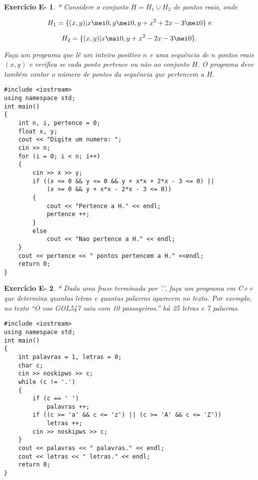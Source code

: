 \documentclass[a4paper]{article}
\newtheorem{eex}{Exerc\'icio E-}
\begin{document}
\newpage 

\begin{eex}
* Considere o conjunto $H = H_1 \cup H_2$ de pontos reais, onde

\[
H_1 = \{ (x,y) | x \mei 0, y \mei 0, y + x^2 + 2x - 3 \mei 0 \} \text{ e}
\]

\[
H_2 = \{ (x,y) | x \mai 0, y + x^2 - 2x - 3 \mei 0 \}.
\]

Faça um programa que lê um inteiro positivo $n$ e uma sequência de $n$ pontos reais $(x,y)$ e verifica se cada ponto pertence ou não ao conjunto $H$. O programa deve também contar o número de pontos da sequência que pertencem a $H$.
\end{eex}

\begin{sol}
\begin{lstlisting}
#include <iostream>
using namespace std;
int main()
{
    int n, i, pertence = 0;
    float x, y;
    cout << "Digite um numero: ";
    cin >> n;
    for (i = 0; i < n; i++)
    {
        cin >> x >> y;
        if ((x <= 0 && y <= 0 && y + x*x + 2*x - 3 <= 0) ||
            (x >= 0 && y + x*x - 2*x - 3 <= 0))
        {
            cout << "Pertence a H." << endl;
            pertence ++;
        }
        else
            cout << "Nao pertence a H." << endl;
    }
    cout << pertence << " pontos pertencem a H." <<endl;
    return 0;
}
\end{lstlisting}
\end{sol}

\newpage 

\begin{eex}
* Dada uma frase terminada por ’.’, faça um programa em C++ que determina quantas letras e quantas palavras aparecem
no texto. Por exemplo, no texto “O voo GOL547 saiu com 10 passageiros.” há 25 letras e 7 palavras.
\end{eex}

\begin{sol}
\begin{lstlisting}
#include <iostream>
using namespace std;
int main()
{
    int palavras = 1, letras = 0;
    char c;
    cin >> noskipws >> c;
    while (c != '.')
    {
        if (c == ' ')
            palavras ++;
        if ((c >= 'a' && c <= 'z') || (c >= 'A' && c <= 'Z'))
            letras ++;
        cin >> noskipws >> c;
    }
    cout << palavras << " palavras." << endl;
    cout << letras << " letras." << endl;
    return 0;
}
\end{lstlisting}
\end{sol}
\end{document}
